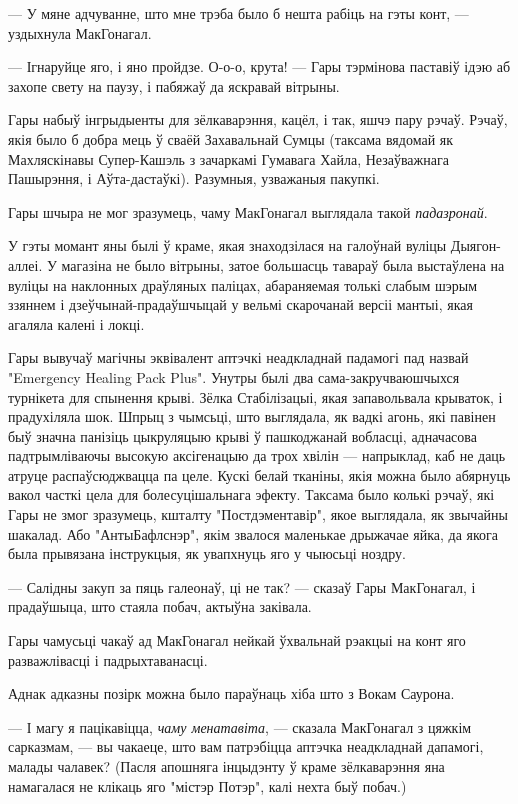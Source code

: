 --- У мяне адчуванне, што мне трэба было б нешта рабіць на гэты конт, --- уздыхнула
МакГонагал.

--- Ігнаруйце яго, і яно пройдзе. О-о-о, крута! --- Гары тэрмінова паставіў ідэю 
аб захопе свету на паузу, і пабяжаў да яскравай вітрыны. 

\later

Гары набыў інгрыдыенты для зёлкаварэння, кацёл, і так, яшчэ пару рэчаў. 
Рэчаў, якія было б добра мець ў сваёй Захавальнай Сумцы (таксама вядомай як
Махляскінавы Супер-Кашэль  з зачаркамі Гумавага Хайла, Незаўважнага Пашырэння,
і Аўта-дастаўкі). Разумныя, узважаныя пакупкі.

Гары шчыра не мог зразумець, чаму МакГонагал выглядала такой \emph{падазронай}.

У гэты момант яны былі ў краме, якая знаходзілася на галоўнай вуліцы 
Дыягон-аллеі. У магазіна не было вітрыны, затое большасць тавараў была выстаўлена
на вуліцы на наклонных драўляных паліцах, абараняемая толькі слабым шэрым ззяннем
і дзеўчынай-прадаўшчыцай у вельмі скарочанай версіі мантыі, якая агаляла калені і 
локці. 

Гары вывучаў магічны эквівалент аптэчкі неадкладнай падамогі пад назвай
"Emergency Healing Pack Plus". Унутры былі два сама-закручваюшчыхся турнікета для
спынення крыві. Зёлка Стабілізацыі, якая запавольвала крываток, і прадухіляла
шок. Шпрыц з чымсьці, што выглядала, як вадкі агонь, які павінен быў 
значна панізіць цыкруляцыю крыві ў пашкоджанай вобласці, адначасова падтрымліваючы
высокую аксігенацыю да трох хвілін --- напрыклад, каб не даць атруце распаўсюджвацца
па целе. Кускі белай тканіны, якія можна было абярнуць вакол часткі цела для 
болесуцішальнага эфекту. Таксама было колькі рэчаў, які Гары не змог зразумець,
кшталту "Постдэментавір", якое выглядала, як звычайны шакалад.
Або "АнтыБафлснэр", якім звалося маленькае дрыжачае яйка, да якога была
прывязана інструкцыя, як увапхнуць яго у чыюсьці ноздру.

--- Салідны закуп за пяць галеонаў, ці не так? --- сказаў Гары МакГонагал,
і прадаўшыца, што стаяла побач, актыўна заківала.

Гары чамусьці чакаў ад МакГонагал нейкай ўхвальнай рэакцыі на конт яго  разважлівасці
і падрыхтаванасці.

Аднак адказны позірк можна было параўнаць хіба што з Вокам Саурона.

--- І магу я пацікавіцца, \emph{чаму менатавіта}, --- сказала МакГонагал з цяжкім
сарказмам, --- вы чакаеце, што вам патрэбіцца аптэчка неадкладнай дапамогі, малады
чалавек? (Пасля апошняга інцыдэнту ў краме зёлкаварэння яна намагалася не клікаць
яго "містэр Потэр", калі нехта быў побач.)

